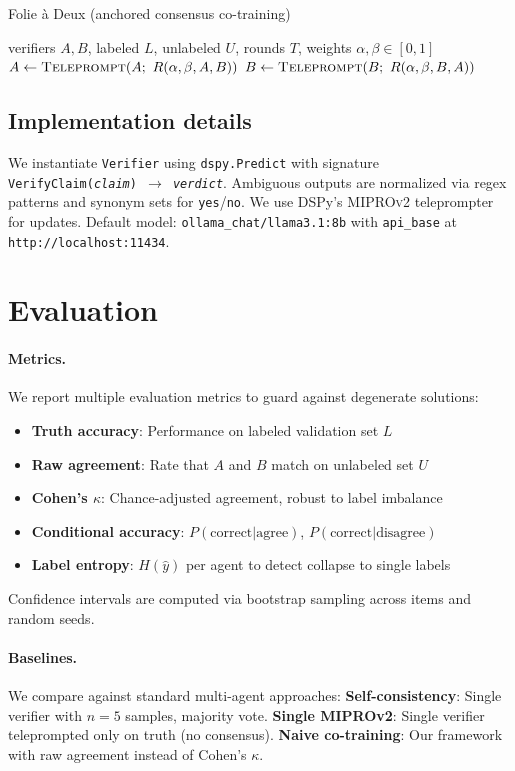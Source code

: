 \documentclass[11pt]{article}
\begin{document}
\begin{algorithm}[H]
\caption{Folie à Deux (anchored consensus co-training)}
\label{alg:foliedeux}
\begin{algorithmic}[1]
\Require verifiers $A,B$, labeled $L$, unlabeled $U$, rounds $T$, weights $\alpha, \beta \in [0,1]$
  \State $A \gets \textsc{Teleprompt}(A;~R(\alpha, \beta, A, B))$
  \State $B \gets \textsc{Teleprompt}(B;~R(\alpha, \beta, B, A))$
\EndFor
\end{algorithmic}
\end{algorithm}

\subsection{Implementation details}
We instantiate \texttt{Verifier} using \texttt{dspy.Predict} with signature \texttt{VerifyClaim(\textit{claim})~$\rightarrow$~\textit{verdict}}.
Ambiguous outputs are normalized via regex patterns and synonym sets for \texttt{yes}/\texttt{no}.
We use DSPy's \textsc{MIPROv2} teleprompter for updates.
Default model: \texttt{ollama\_chat/llama3.1:8b} with \texttt{api\_base} at \texttt{http://localhost:11434}.

\section{Evaluation}
\paragraph{Metrics.}
We report multiple evaluation metrics to guard against degenerate solutions:
\begin{itemize}[leftmargin=15pt]
\item \textbf{Truth accuracy}: Performance on labeled validation set $L$
\item \textbf{Raw agreement}: Rate that $A$ and $B$ match on unlabeled set $U$ 
\item \textbf{Cohen's $\kappa$}: Chance-adjusted agreement, robust to label imbalance
\item \textbf{Conditional accuracy}: $P(\text{correct}|\text{agree})$, $P(\text{correct}|\text{disagree})$
\item \textbf{Label entropy}: $H(\hat{y})$ per agent to detect collapse to single labels
\end{itemize}
Confidence intervals are computed via bootstrap sampling across items and random seeds.

\paragraph{Baselines.}
We compare against standard multi-agent approaches:
\textbf{Self-consistency}: Single verifier with $n=5$ samples, majority vote.
\textbf{Single MIPROv2}: Single verifier teleprompted only on truth (no consensus).
\textbf{Naive co-training}: Our framework with raw agreement instead of Cohen's $\kappa$.
\end{document}
